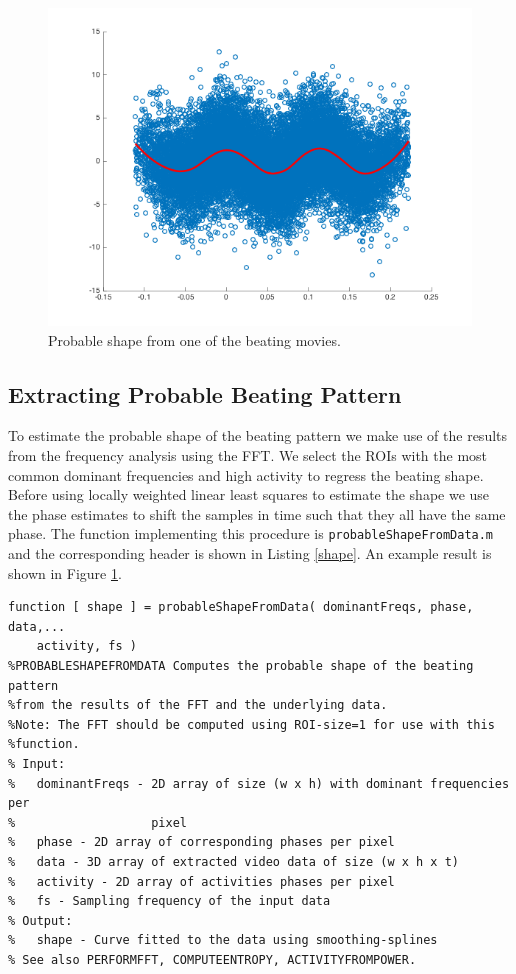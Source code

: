\documentclass[11pt]{scrartcl}
\begin{document}
\begin{figure}[h]
  \centering
  \includegraphics[width=.5\linewidth]{shape}
  \caption{Probable shape from one of the beating movies. }
  \label{fig:shape}
\end{figure}

\subsection{Extracting Probable Beating Pattern}

To estimate the probable shape of the beating pattern we make use of the results from the frequency analysis using the FFT. We select the ROIs with the most common dominant frequencies and high activity to regress the beating shape. Before using locally weighted linear least squares to estimate the shape we use the phase estimates to shift the samples in time such that they all have the same phase. The function implementing this procedure is \texttt{probableShapeFromData.m} and the corresponding header is shown in Listing \ref{shape}. An example result is shown in Figure \ref{fig:shape}.

\begin{minipage}{\linewidth}
  \begin{lstlisting}[caption={Function for extracting the probable beating pattern.}, label=shape]
function [ shape ] = probableShapeFromData( dominantFreqs, phase, data,...
    activity, fs )
%PROBABLESHAPEFROMDATA Computes the probable shape of the beating pattern 
%from the results of the FFT and the underlying data.
%Note: The FFT should be computed using ROI-size=1 for use with this 
%function.
% Input:
%   dominantFreqs - 2D array of size (w x h) with dominant frequencies per 
%                   pixel 
%   phase - 2D array of corresponding phases per pixel
%   data - 3D array of extracted video data of size (w x h x t)
%   activity - 2D array of activities phases per pixel
%   fs - Sampling frequency of the input data
% Output:
%   shape - Curve fitted to the data using smoothing-splines
% See also PERFORMFFT, COMPUTEENTROPY, ACTIVITYFROMPOWER.  
\end{lstlisting}
\end{minipage}
\end{document}
